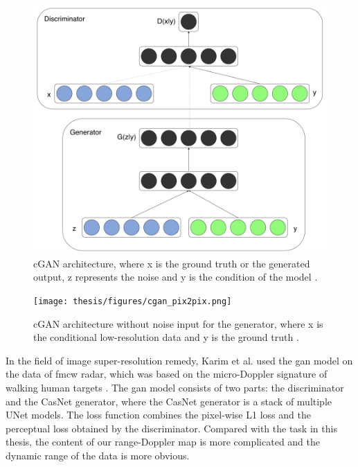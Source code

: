 \begin{figure}
	\centering
	\includegraphics[scale=.65]{figures/cgan_paper.png}
	\caption{cGAN architecture, where x is the ground truth or the generated output, z represents the noise and y is the condition of the model \cite{mirza_conditional_2014}.}
	\label{cgan illustrated architecture}
\end{figure}

\begin{figure}
	\centering
	\texttt{[image: thesis/figures/cgan\_pix2pix.png]}
	\caption{cGAN architecture without noise input for the generator, where x is the conditional low-resolution data and y is the ground truth \cite{isola_image--image_2018}.}
	\label{cgan architecture without noise for the generator}
\end{figure}

In the field of image super-resolution remedy, Karim et al. used the \gls{gan} model on the data of \gls{fmcw} radar, which was based on the micro-Doppler signature of walking human targets \cite{armanious_adversarial_2019}. The \gls{gan} model consists of two parts: the discriminator and the CasNet generator, where the CasNet generator is a stack of multiple UNet models. The loss function combines the pixel-wise L1 loss and the perceptual loss obtained by the discriminator. Compared with the task in this thesis, the content of our range-Doppler map is more complicated and the dynamic range of the data is more obvious.

